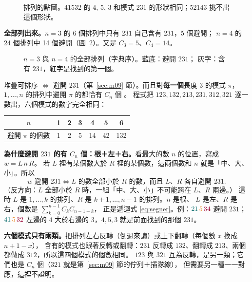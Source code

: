 \begin{figure}[H]
\centering
\FigMtenPlots
\caption{排列的點圖。$41532$ 的 \textcolor{cTop}{4, 5, 3} 和模式 $231$ 的形狀相同；$52143$ 挑不出這個形狀。}
\label{fig:m10-plots}
\end{figure}

\textbf{全部列出來。}$n=3$ 的 6 個排列中只有 $231$ 自己含有 $231$，5 個避開；
$n=4$ 的 24 個排列中 14 個避開（圖~\ref{fig:m10-grid}）。又是 $C_3=5$、$C_4=14$。

\begin{figure}[H]
\centering
\FigMtenGrid
\caption{$n=3$ 與 $n=4$ 的全部排列（字典序）。\textcolor{cA}{藍底}：避開 $231$；
灰字：含有 $231$，\textcolor{cBad}{紅字}是找到的第一個。}
\label{fig:m10-grid}
\end{figure}

\begin{thmbox}[定理]
堆疊可排序 $\iff$ 避開 $231$（第~\ref{sec:m09} 節）。而且對\textbf{每一個}長度 3 的模式 $\pi$，
$1,\ldots,n$ 的排列中避開 $\pi$ 的都恰有 $C_n$ 個 。
程式把 $123,132,213,231,312,321$ 逐一數出，六個模式的數字完全相同：
\begin{center}
\begin{tabular}{c|cccccc}
$n$ & 1 & 2 & 3 & 4 & 5 & 6\\
\hline
避開 $\pi$ 的個數 & 1 & 2 & 5 & 14 & 42 & 132
\end{tabular}
\end{center}
\end{thmbox}

\textbf{為什麼避開 $231$ 的有 $C_n$ 個：根＋左＋右。}看最大的數 $n$ 的位置，寫成 $w=L\,n\,R$。
若 $L$ 裡有某個數大於 $R$ 裡的某個數，這兩個數和 $n$ 就是「中、大、小」。所以
\[
\text{$w$ 避開 $231$}\iff\text{$L$ 的數全部小於 $R$ 的數，而且 $L$、$R$ 各自避開 $231$}.
\]
（反方向：$L$ 全部小於 $R$ 時，一組「中、大、小」不可能跨在 $L$、$R$ 兩邊。）
這時 $L$ 是 $1,\ldots,k$ 的排列、$R$ 是 $k+1,\ldots,n-1$ 的排列。$n$ 是\textcolor{cTop}{根}、
$L$ 是\textcolor{cLeft}{左}、$R$ 是\textcolor{cRight}{右}，個數是 $\sum_{k=0}^{n-1}C_kC_{n-1-k}$，
正是遞迴式 \eqref{eq:segner}。例：$\textcolor{cLeft}{21}\,\textcolor{cTop}{5}\,\textcolor{cRight}{34}$ 避開 $231$；
$\textcolor{cLeft}{41}\,\textcolor{cTop}{5}\,\textcolor{cRight}{32}$ 左邊的 $4$ 大於右邊的 $3$，$4,5,3$ 就是前面找到的那個 $231$。

\textbf{六個模式只有兩類。}把排列左右反轉（倒過來讀）或上下翻轉（每個數 $x$ 換成 $n+1-x$），
含有的模式也跟著反轉或翻轉：$231$ 反轉成 $132$、翻轉成 $213$、兩個都做成 $312$，所以這四個模式的個數相同。
$123$ 與 $321$ 互為反轉，是另一類；它們也是 $C_n$ 個（$321$ 就是第~\ref{sec:m09} 節的佇列＋插隊線），
但需要另一種一一對應，這裡不證明。

